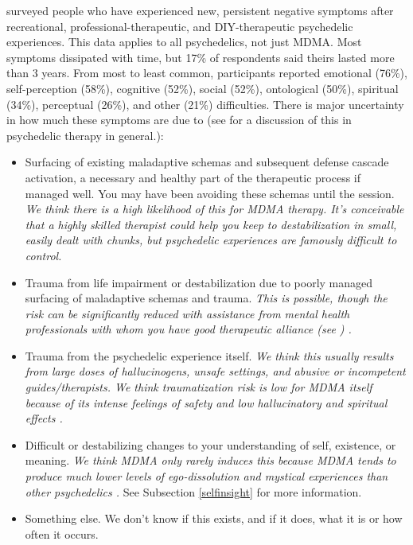 \documentclass[12pt,letterpaper]{book}
\begin{document}
\textcite{evans2023extended} surveyed people who have experienced new, persistent negative symptoms after recreational, professional-therapeutic, and DIY-therapeutic psychedelic experiences. This data applies to all psychedelics, not just MDMA. Most symptoms dissipated with time, but 17\% of respondents said theirs lasted more than 3 years. From most to least common, participants reported emotional (76\%), self-perception (58\%), cognitive (52\%), social (52\%), ontological (50\%), spiritual (34\%), perceptual (26\%), and other (21\%) difficulties. There is major uncertainty in how much these symptoms are due to (see \textcite{calder2025traumatic} for a discussion of this in psychedelic therapy in general.):
\begin{itemize}
	\item Surfacing of existing maladaptive schemas and subsequent defense cascade activation, a necessary and healthy part of the therapeutic process if managed well. You may have been avoiding these schemas until the session. \textit{We think there is a high likelihood of this for MDMA therapy. It's conceivable that a highly skilled therapist could help you keep to destabilization in small, easily dealt with chunks, but psychedelic experiences are famously difficult to control.}
	\item Trauma from life impairment or destabilization due to poorly managed surfacing of maladaptive schemas and trauma. \textit{This is possible, though the risk can be significantly reduced with assistance from mental health professionals with whom you have good therapeutic alliance (see \textcite{BRWAIdownload}) \cite{fluckiger2018alliance}.}
	\item Trauma from the psychedelic experience itself. \textit{We think this usually results from large doses of hallucinogens, unsafe settings, and abusive or incompetent guides/therapists. We think traumatization risk is low for MDMA itself because of its intense feelings of safety and low hallucinatory and spiritual effects \cite{studerus2010psychometric}.}
	\item Difficult or destabilizing changes to your understanding of self, existence, or meaning. \textit{We think MDMA only rarely induces this because MDMA tends to produce much lower levels of ego-dissolution and mystical experiences than other psychedelics \cite{mdmaExtendedEvans,holze2020distinct}.} See Subsection \ref{selfinsight} for more information.
	\item Something else. We don't know if this exists, and if it does, what it is or how often it occurs.
\end{itemize}
\end{document}
